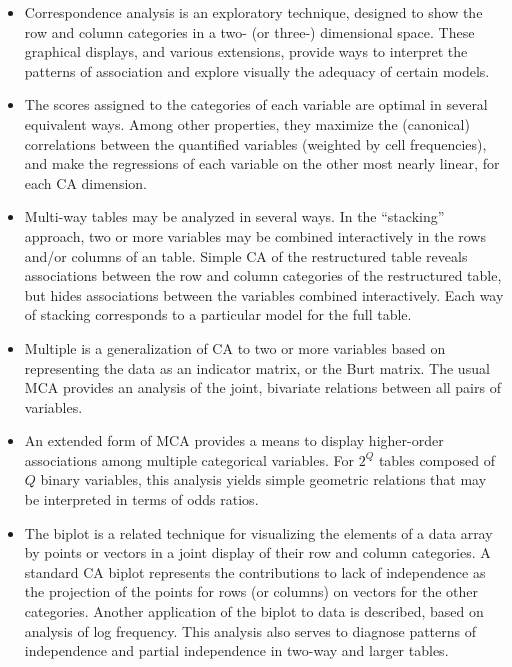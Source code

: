 \begin{itemize}
\item Correspondence analysis is an exploratory technique, designed to
show the row and column categories in a two- (or three-) dimensional
space.  These graphical displays, and various extensions, provide
ways to interpret the patterns of association and explore visually
the adequacy of certain \loglin models.

\item The scores assigned to the categories of each variable are optimal
in several equivalent ways.
Among other properties,
they maximize the (canonical) correlations between the quantified
variables (weighted by cell frequencies), and make the regressions
of each variable on the other most nearly linear, for each CA dimension.

\item Multi-way tables may be analyzed in several ways.
In the ``stacking'' approach, two or more variables may be combined
interactively in the rows and/or columns of an \nway table.
Simple CA of the restructured table reveals associations between
the row and column categories of the restructured table,
but hides associations between the variables combined interactively.
Each way of stacking corresponds to a particular \loglin model
for the full table.

\item Multiple \ca is a generalization of CA to two or more variables
based on representing the data as an indicator matrix, or the Burt matrix.
The usual MCA provides an analysis of the joint, bivariate relations
between all pairs of variables.

\item An extended form of MCA provides a means to display higher-order
associations among multiple categorical variables.
For $2^Q$ tables composed of $Q$ binary variables, this analysis yields
simple geometric relations that may be interpreted in terms of odds ratios.

\item The biplot is a related technique for visualizing the elements of
a data array by points or vectors in a joint display of their row and
column categories. A standard CA biplot represents the contributions to
lack of independence as the projection of the points for rows
(or columns) on vectors for the other categories.
Another application of the biplot to \ctab data is described, based on analysis
of log frequency.
This analysis also serves to diagnose patterns of independence and
partial independence in two-way and larger tables.
\end{itemize}
